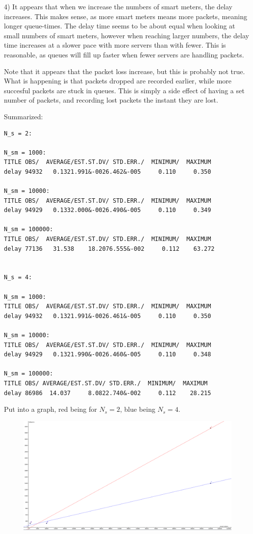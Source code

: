 \documentclass[11pt]{article}
\begin{document}
4) It appears that when we increase the numbers of smart meters, the delay increases. This makes sense, as more smart meters means more packets, meaning longer queue-times. The delay time seems to be about equal when looking at small numbers of smart meters, however when reaching larger numbers, the delay time increases at a slower pace with more servers than with fewer. This is reasonable, as queues will fill up faster when fewer servers are handling packets.

Note that it appears that the packet loss increase, but this is probably not true. What is happening is that packets dropped are recorded earlier, while more succesful packets are stuck in queues. This is simply a side effect of having a set number of packets, and recording lost packets the instant they are lost.

Summarized:

\begin{lstlisting}
N_s = 2:

N_sm = 1000:
TITLE OBS/  AVERAGE/EST.ST.DV/ STD.ERR./  MINIMUM/  MAXIMUM
delay 94932   0.1321.991&-0026.462&-005     0.110     0.350

N_sm = 10000:
TITLE OBS/  AVERAGE/EST.ST.DV/ STD.ERR./  MINIMUM/  MAXIMUM
delay 94929   0.1332.000&-0026.490&-005     0.110     0.349

N_sm = 100000:
TITLE OBS/  AVERAGE/EST.ST.DV/ STD.ERR./  MINIMUM/  MAXIMUM
delay 77136   31.538    18.2076.555&-002     0.112    63.272


N_s = 4:

N_sm = 1000:
TITLE OBS/  AVERAGE/EST.ST.DV/ STD.ERR./  MINIMUM/  MAXIMUM
delay 94932   0.1321.991&-0026.461&-005     0.110     0.350

N_sm = 10000:
TITLE OBS/  AVERAGE/EST.ST.DV/ STD.ERR./  MINIMUM/  MAXIMUM
delay 94929   0.1321.990&-0026.460&-005     0.110     0.348

N_sm = 100000:
TITLE OBS/ AVERAGE/EST.ST.DV/ STD.ERR./  MINIMUM/  MAXIMUM
delay 86986  14.037     8.0822.740&-002     0.112    28.215

\end{lstlisting}

Put into a graph, red being for $N_s = 2$, blue being $N_s = 4$.

\begin{figure}[H]
	\includegraphics[width=\textwidth]{geogebrabilde.png}
	\centering
\end{figure}
\end{document}
